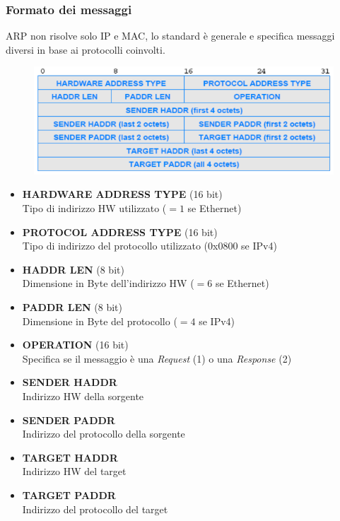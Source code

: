 \documentclass{article}
\begin{document}
            \subsubsection{Formato dei messaggi}
                ARP non risolve solo IP e MAC, lo standard è generale e specifica messaggi diversi in base ai protocolli coinvolti.
                \begin{figure}[H]
                    \centering
                    \includegraphics[width=\textwidth]{pic/arp.png}
                    \label{Messaggio ARP}
                \end{figure}
                \begin{itemize}
                    \item \textbf{HARDWARE ADDRESS TYPE} (16 bit) \\
                          Tipo di indirizzo HW utilizzato ($ =1 $ se Ethernet)
                    \item \textbf{PROTOCOL ADDRESS TYPE} (16 bit) \\
                          Tipo di indirizzo del protocollo utilizzato (0x0800 se IPv4)
                    \item \textbf{HADDR LEN} (8 bit) \\
                          Dimensione in Byte dell'indirizzo HW ($ =6 $ se Ethernet)
                    \item \textbf{PADDR LEN} (8 bit) \\
                          Dimensione in Byte del protocollo ($ =4 $ se IPv4)
                    \item \textbf{OPERATION} (16 bit) \\
                          Specifica se il messaggio è una \textit{Request} (1) o una \textit{Response} (2)
                    \item \textbf{SENDER HADDR} \\
                          Indirizzo HW della sorgente
                    \item \textbf{SENDER PADDR} \\
                          Indirizzo del protocollo della sorgente
                    \item \textbf{TARGET HADDR} \\
                          Indirizzo HW del target
                    \item \textbf{TARGET PADDR} \\
                          Indirizzo del protocollo del target 
                \end{itemize}
\end{document}
